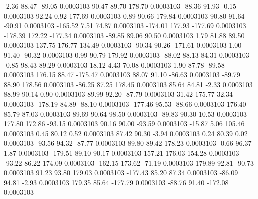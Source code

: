        -2.36       88.47      -89.05     0.0003103
       90.47       89.70      178.70     0.0003103
      -88.36       91.93       -0.15     0.0003103
       92.24        0.92      177.69     0.0003103
        0.89       90.66      179.84     0.0003103
       90.80       91.64      -90.91     0.0003103
     -165.52        7.51       74.87     0.0003103
     -174.01      177.93     -177.69     0.0003103
     -178.39      172.22     -177.34     0.0003103
      -89.85       89.06       90.50     0.0003103
        1.79       81.88       89.50     0.0003103
      137.75      176.77      134.49     0.0003103
      -90.34       90.26     -171.61     0.0003103
        1.00       91.40      -90.32     0.0003103
        0.99       90.79      179.92     0.0003103
      -88.02       88.13       84.31     0.0003103
       -0.85       98.43       89.29     0.0003103
       18.12        4.43       70.08     0.0003103
        1.90       87.78      -89.58     0.0003103
      176.15       88.47     -175.47     0.0003103
       88.07       91.10      -86.63     0.0003103
      -89.79       88.90      178.56     0.0003103
      -86.25       87.25      178.45     0.0003103
       85.64       84.81       -2.33     0.0003103
       88.99       90.14        0.90     0.0003103
       89.99       92.20      -87.79     0.0003103
       31.42      175.77       32.34     0.0003103
     -178.19       84.89      -88.10     0.0003103
     -177.46       95.53      -88.66     0.0003103
      176.40       85.79       87.03     0.0003103
       89.69       90.64       98.50     0.0003103
      -89.83       90.30       10.53     0.0003103
      177.80      172.86      -93.15     0.0003103
       90.16       90.00      -93.59     0.0003103
      -15.87        5.06      105.46     0.0003103
        0.45       80.12        0.52     0.0003103
       87.42       90.30       -3.94     0.0003103
        0.24       80.39        0.02     0.0003103
      -93.56       94.32      -87.77     0.0003103
       89.80       89.42      178.23     0.0003103
       -0.66       96.37        1.87     0.0003103
     -179.51       89.10       90.17     0.0003103
      157.21      176.03      154.28     0.0003103
      -93.22       86.22      174.09     0.0003103
     -162.15      173.62      -71.19     0.0003103
      179.89       92.81      -90.73     0.0003103
       91.23       93.80      179.03     0.0003103
     -177.43       85.20       87.34     0.0003103
      -86.09       94.81       -2.93     0.0003103
      179.35       85.64     -177.79     0.0003103
      -88.76       91.40     -172.08     0.0003103
